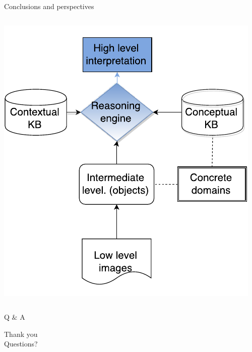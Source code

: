 \documentclass{beamer}
\begin{document}
\begin{frame}{Conclusions and perspectives}
\begin{columns}
  \begin{column}{.3\textwidth}
    \includegraphics[width=.9\textwidth]{images/flowchart_ar_crop.pdf}
  \end{column}


\end{columns}

% 
\end{frame}


\begin{frame}{Q $\&$ A}
\begin{center}
 Thank you\\

Questions?
\end{center}
\end{frame}
\end{document}
